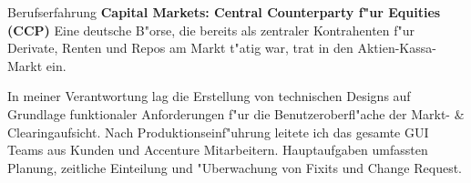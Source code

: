 \begin{rubric}{Berufserfahrung}
\entry*[12/2001 - 06/2003] \textbf{Capital Markets: Central Counterparty f"ur Equities (CCP)}\newline
{} 
Eine deutsche B"orse, die bereits als zentraler Kontrahenten f"ur Derivate, Renten und Repos am Markt t"atig war, trat in den Aktien-Kassa-Markt ein. %

In meiner Verantwortung lag die Erstellung von technischen Designs auf Grundlage funktionaler Anforderungen f"ur die Benutzeroberfl"ache der Markt- \& Clearingaufsicht. Nach Produktionseinf"uhrung leitete ich das gesamte GUI Teams aus Kunden und Accenture Mitarbeitern. Hauptaufgaben umfassten Planung, zeitliche Einteilung und "Uberwachung von Fixits und Change Request. 



\end{rubric}
